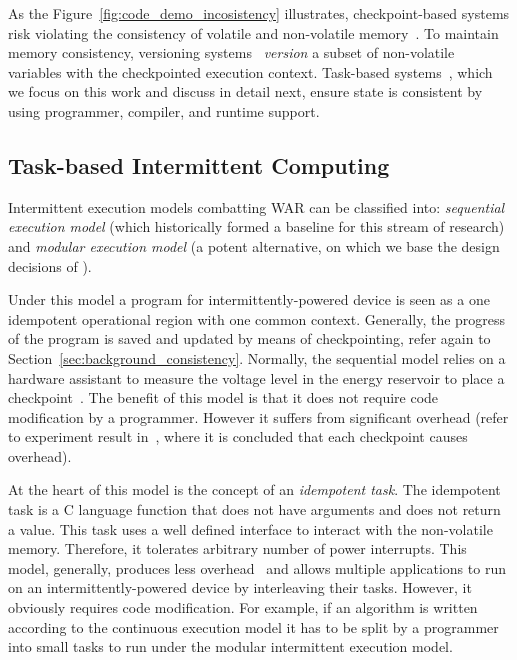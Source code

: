 As the Figure~\ref{fig:code_demo_incosistency} illustrates, checkpoint-based systems risk violating the consistency of volatile and non-volatile memory~\cite{dino}. To maintain memory consistency, versioning systems~\cite{dino,ratchet} {\em version} a subset of non-volatile variables with the checkpointed execution context. Task-based systems~\cite{chain,alpaca}, which we focus on this work and discuss in detail next, ensure state is consistent by using programmer, compiler, and runtime support.

\subsection{Task-based Intermittent Computing}
\label{section:background_task_computing}


Intermittent execution models combatting WAR can be classified into: \emph{sequential execution model} (which historically formed a baseline for this stream of research) and \emph{modular execution model} (a potent alternative, on which we base the design decisions of \sys). 

Under this model a program for intermittently-powered device is seen as a one idempotent operational region with one common context. Generally, the progress of the program is saved and updated by means of checkpointing, refer again to Section~\ref{sec:background_consistency}. Normally, the sequential model relies on a hardware assistant to measure the voltage level in the energy reservoir to place a checkpoint~\cite{mementos,mottola2017harvos,hibernus}. The benefit of this model is that it does not require code modification by a programmer. However it suffers from significant overhead (refer to experiment result in~\cite[Fig. 3]{chain}, where it is concluded that each checkpoint causes overhead). 

At the heart of this model is the concept of an \emph{idempotent task}. The idempotent task is a C language function that does not have arguments and does not return a value. This task uses a well defined interface to interact with the non-volatile memory. Therefore, it tolerates arbitrary number of power interrupts. This model, generally, produces less overhead~\cite{chain} and allows multiple applications to run on an intermittently-powered device by interleaving their tasks. However, it obviously requires code modification. For example, if an algorithm is written according to the continuous execution model it has to be split by a programmer into small tasks to run under the modular intermittent execution model.

